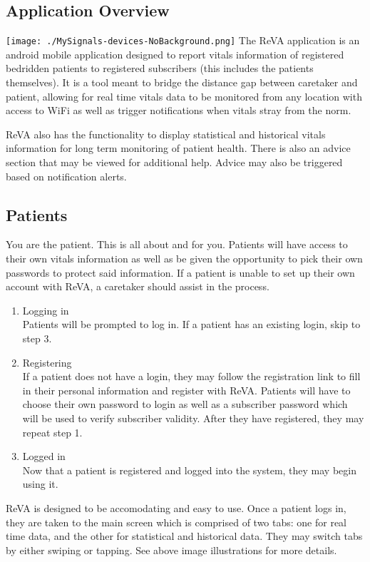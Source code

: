 \subsection{Application Overview}
\texttt{[image: ./MySignals-devices-NoBackground.png]}
The ReVA application is an android mobile application designed to report vitals information of registered bedridden patients to registered subscribers (this includes the patients themselves). It is a tool meant to bridge the distance gap between caretaker and patient, allowing for real time vitals data to be monitored from any location with access to WiFi as well as trigger notifications when vitals stray from the norm. 

ReVA also has the functionality to display statistical and historical vitals information for long term monitoring of patient health. There is also an advice section that may be viewed for additional help. Advice may also be triggered based on notification alerts. 

\subsection{Patients}
	You are the patient. This is all about and for you. Patients will have access to their own vitals information as well as be given the opportunity to pick their own passwords to protect said information. If a patient is unable to set up their own account with ReVA, a caretaker should assist in the process. 
	\begin{enumerate}	
	\item Logging in\\
		Patients will be prompted to log in. If a patient has an existing login, skip to step 3. 
	\item Registering\\
		If a patient does not have a login, they may follow the registration link to fill in their personal information and 			register with ReVA. Patients will have to choose their own password to login as well as a subscriber password which will 		 be used to verify subscriber validity. After they have registered, they may repeat step 1. 
	\item Logged in\\
		Now that a patient is registered and logged into the system, they may begin using it. 
	\end{enumerate}
	ReVA is designed to be accomodating and easy to use. Once a patient logs in, they are taken to the main screen which is comprised of two tabs: one for real time data, and the other for statistical and historical data. They may switch tabs by either swiping or tapping. See above image illustrations for more details. 
	
